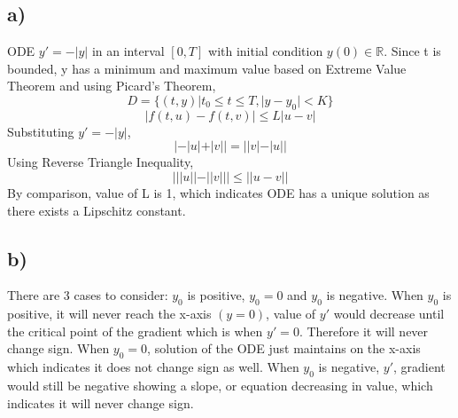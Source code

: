 \documentclass{article}
\begin{document}
\subsection*{a)} 
ODE $y'=-|y|$ in an interval $[0,T]$ with initial condition $y(0)\in \mathbb{R}$. Since t is bounded, y has a minimum and maximum value based on Extreme Value Theorem and using Picard's Theorem, 
\begin{equation*}
    D=\{(t,y) |t_0\leq t \leq T, |y-y_0| <K\}
\end{equation*}
\begin{equation*}
    |f(t,u)-f(t,v)| \leq L|u-v|
\end{equation*}
Substituting $y'=-|y|$, 
\begin{equation*}
    |-|u|+|v||=||v|-|u||
\end{equation*}
Using Reverse Triangle Inequality,
\begin{equation*}
       |||u||-||v|||\leq||u-v||
\end{equation*}
By comparison, value of L is 1, which indicates ODE has a unique solution as there exists a Lipschitz constant. 

\subsection*{b)}
There are 3 cases to consider: $y_0$ is positive, $y_0=0$  and $y_0$ is negative. When $y_0$ is positive, it will never reach the x-axis $(y=0)$, value of $y'$ would decrease until the critical point of the gradient which is when $y'=0$. Therefore it will never change sign. When $y_0=0$, solution of the ODE just maintains on the x-axis which indicates it does not change sign as well. When $y_0$ is negative, $y'$, gradient would still be negative showing a slope, or equation decreasing in value, which indicates it will never change sign. 
\end{document}
